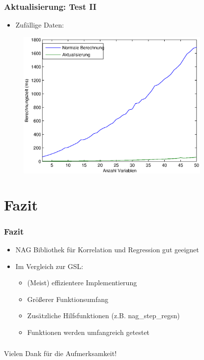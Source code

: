 \documentclass{beamer}
\begin{document}
\begin{frame}
  \frametitle{Aktualisierung: Test II}
  
  \begin{itemize}
  \item Zufällige Daten:
  \end{itemize}

  \begin{figure}[t]
    \centering
    \includegraphics[width=9.5cm]{figures/multi_reg_vars_2500_obs_act_rand.eps}
  \end{figure}

\end{frame}


\section{Fazit}
\begin{frame}
  \frametitle{Fazit}
  
  \begin{itemize}
  \item NAG Bibliothek für Korrelation und Regression gut geeignet
  \item Im Vergleich zur GSL:
    \begin{itemize}
    \item (Meist) effizientere Implementierung
    \item Größerer Funktionsumfang
    \item Zusätzliche Hilfsfunktionen (z.B. nag\_step\_regsn)
    \item Funktionen werden umfangreich getestet
    \end{itemize}
  \end{itemize}
  
\end{frame}

\begin{frame}
  \frametitle{}

  \begin{center}
    {\Large Vielen Dank für die Aufmerksamkeit!}
  \end{center}

\end{frame}
\end{document}
